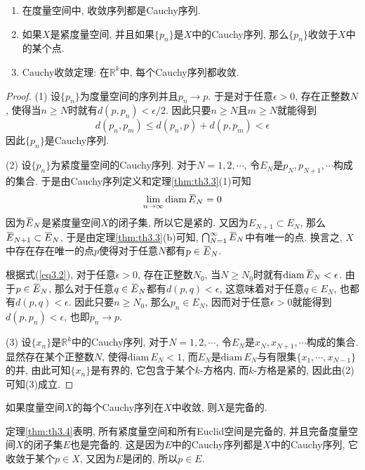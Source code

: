 \documentclass[cn,12pt,math=mtpro2,citestyle=gb7714-2015,bibstyle=gb7714-2015,twocol]{elegantbook}
\newcommand{\R}{\mathbb{R}}
\newcommand{\diam}{\text{diam}\,}
\newcommand{\bx}{x}
\newcommand{\limn }{\lim_{n\to\infty}}
\newcommand{\overbar}[1]{\mkern 1.5mu\overline{\mkern-1.5mu#1\mkern-1.5mu}\mkern 1.5mu}
\begin{document}
\begin{theorem}\label{thm:th3.4}
   \begin{enumerate}[label=(\arabic*)]
  \item 在度量空间中, 收敛序列都是Cauchy序列.

  \item 如果$X$是紧度量空间, 并且如果$\{p_n\}$是$X$中的Cauchy序列, 那么$\{p_n\}$收敛于$X$中的某个点.

  \item Cauchy收敛定理: 在$\R^k$中, 每个Cauchy序列都收敛.
  \end{enumerate}
\end{theorem}
\begin{proof}
  (1) 设$\{p_n\}$为度量空间的序列并且$p_n\rightarrow p$. 于是对于任意$\epsilon>0$, 存在正整数$N$, 使得当$n\geq N$时就有$d(p,p_n)<\epsilon/2$. 因此只要$n\geq N$且$m\geq N$就能得到
  $$d(p_n,p_m)\leq d(p_n,p)+d(p,p_m)<\epsilon$$
  因此$\{p_n\}$是Cauchy序列.

  (2) 设$\{p_n\}$为紧度量空间的Cauchy序列. 对于$N=1,2,\cdots$, 令$E_N$是$p_{N}, p_{N+1},\cdots$构成的集合. 于是由Cauchy序列定义和定理\textcolor[rgb]{1.00,0.53,0.09}{\ref{thm:th3.3}}(1)可知
  \begin{equation}\label{eq3.2}
  \limn  \diam\overbar{E}_N=0
  \end{equation}
  因为$\overbar{E}_N$是紧度量空间$X$的闭子集, 所以它是紧的. 又因为$E_{N+1}\subset E_N$, 那么$\overbar{E}_{N+1}\subset\overbar{E}_N$, 于是由定理\ref{thm:th3.3}(b)可知, $\bigcap_{N=1}^\infty\overbar{E}_N$中有唯一的点. 换言之, $X$中存在存在唯一的点$p$使得对于任意$N$都有$p\in\overbar{E}_N$.

  根据式(\ref{eq3.2}), 对于任意$\epsilon>0$, 存在正整数$N_0$, 当$N\geq N_0$时就有$\diam \overbar{E}_N<\epsilon$. 由于$p\in\overbar{E}_N$, 那么对于任意$q\in \overbar{E}_N$都有$d(p,q)<\epsilon$, 这意味着对于任意$q\in E_N$, 也都有$d(p,q)<\epsilon$. 因此只要$n\geq N_0$, 那么$p_n\in E_N$, 因而对于任意$\epsilon>0$就能得到$d(p,p_n)<\epsilon$, 也即$p_n\rightarrow p$.

  (3) 设$\{\bx_n\}$是$\R^k$中的Cauchy序列, 对于$N=1,2,\cdots$, 令$E_N$是$\bx_{N}, \bx_{N+1},\cdots$构成的集合. 显然存在某个正整数$N$, 使得$\diam E_N<1$, 而$E_N$是$\diam E_N$与有限集$\{\bx_1,\cdots,\bx_{N-1}\}$的并, 由此可知$\{\bx_n\}$是有界的, 它包含于某个$k$-方格内, 而$k$-方格是紧的, 因此由(2)可知(3)成立.

\end{proof}
\begin{definition}\label{def:def3.5}
如果度量空间$X$的每个Cauchy序列在$X$中收敛, 则$X$是完备的.
\end{definition}
\begin{remark}
定理\ref{thm:th3.4}表明, 所有紧度量空间和所有Euclid空间是完备的, 并且完备度量空间$X$的闭子集$E$也是完备的. 这是因为$E$中的Cauchy序列都是$X$中的Cauchy序列, 它收敛于某个$p\in X$, 又因为$E$是闭的, 所以$p \in E$.
\end{remark}
\end{document}
